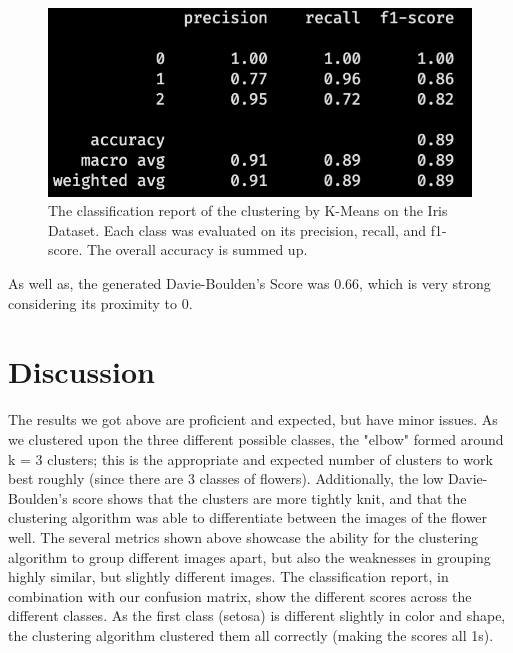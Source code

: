 \documentclass[10pt,twocolumn]{article}
\begin{document}
\begin{figure}[h!]
  \centering
  \includegraphics[scale=0.3]{class_report_iris.png}
  \vspace{20px}
  \caption{The classification report of the clustering by K-Means on the Iris Dataset. Each class was evaluated on its precision, recall, and f1-score. The overall accuracy is summed up.}
  \label{class_report_iris}
\end{figure}

As well as, the generated Davie-Boulden's Score was 0.66, which is very strong considering its proximity to 0.

\section {Discussion}



The results we got above are proficient and expected, but have minor issues. As we clustered upon the three different possible classes, the "elbow" formed around k = 3 clusters; this is the appropriate and expected number of clusters to work best roughly (since there are 3 classes of flowers). Additionally, the low Davie-Boulden's score shows that the clusters are more tightly knit, and that the clustering algorithm was able to differentiate between the images of the flower well. The several metrics shown above showcase the ability for the clustering algorithm to group different images apart, but also the weaknesses in grouping highly similar, but slightly different images. The classification report, in combination with our confusion matrix, show the different scores across the different classes. As the first class (setosa) is different slightly in color and shape, the clustering algorithm clustered them all correctly (making the scores all 1s). 
\end{document}
